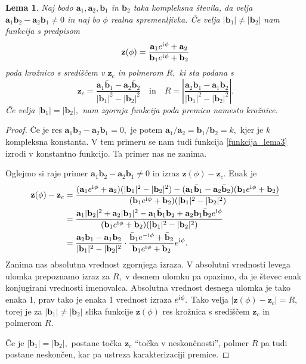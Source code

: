 \documentclass[12pt,a4paper,twoside]{article}
\newcommand{\iu}{\mathrm{i}\mkern1mu} %
\theoremstyle{definition} %
\theoremstyle{plain} %
\newtheorem{lema}[definicija]{Lema}
\numberwithin{equation}{section}  %
\newcommand{\aV}{\mathbf{a}}
\newcommand{\bV}{\mathbf{b}}
\newcommand{\zV}{\mathbf{z}}
\begin{document}
\begin{lema}
	\label{lema_3}
	Naj bodo $\aV_1,\aV_2,\bV_1$ in $\bV_2$ taka kompleksna števila, da velja $\aV_1\bV_2-\aV_2\bV_1\neq 0$ in naj bo $\phi$ realna spremenljivka. Če velja $|\bV_1|\neq|\bV_2|$ nam funkcija s predpisom
	\begin{equation}
		\label{funkcija_lema3}
		\zV(\phi)=\frac{\aV_1e^{\iu\phi}+\aV_2}{\bV_1e^{\iu\phi}+\bV_2}
	\end{equation}
	poda krožnico s središčem v $\zV_c$ in polmerom $R,$ ki sta podana s
	\begin{equation}
		\zV_c=\frac{\aV_1\bar{\bV}_1-\aV_2\bar{\bV}_2}{|\bV_1|^2-|\bV_2|^2}\quad\text{in}\quad R=\left|\frac{\aV_2\bV_1-\aV_1\bV_2}{|\bV_1|^2-|\bV_2|^2}\right|.
	\end{equation}
	Če velja $|\bV_1|=|\bV_2|,$ nam zgornja funkcija poda premico namesto krožnice.
\end{lema}
\begin{proof}
	Če je res $\aV_1\bV_2-\aV_2\bV_1=0,$ je potem $\aV_1/\aV_2=\bV_1/\bV_2=k,$ kjer je $k$ kompleksna konstanta. V tem primeru se nam tudi funkcija \eqref{funkcija_lema3} izrodi v konstantno funkcijo. Ta primer nas ne zanima.
	
	Oglejmo si raje primer $\aV_1\bV_2-\aV_2\bV_1\neq 0$ in izraz $\zV(\phi)-\zV_c.$ Enak je
	\begin{align*}
		\zV(\phi)-\zV_c&=\frac{(\aV_1e^{\iu\phi}+\aV_2)(|\bV_1|^2-|\bV_2|^2)-(\aV_1\bar{\bV}_1-\aV_2\bar{\bV}_2)(\bV_1e^{\iu\phi}+\bV_2)}{(\bV_1e^{\iu\phi}+\bV_2)(|\bV_1|^2-|\bV_2|^2)}\\
		&=\frac{\aV_1|\bV_2|^2+\aV_2|\bV_1|^2-\aV_1\bar{\bV}_1\bV_2+\aV_2\bV_1\bar{\bV}_2e^{\iu\phi}}{(\bV_1e^{\iu\phi}+\bV_2)(|\bV_1|^2-|\bV_2|^2)}\\
		&=\frac{\aV_2\bV_1-\aV_1\bV_2}{|\bV_1|^2-|\bV_2|^2}\cdot\frac{\bar{\bV}_1e^{-\iu\phi}+\bar{\bV}_2}{\bV_1e^{\iu\phi}+\bV_2}e^{\iu\phi}.
	\end{align*}
	Zanima nas absolutna vrednost zgornjega izraza. V absolutni vrednosti levega ulomka prepoznamo izraz za $R,$ v desnem ulomku pa opazimo, da je števec enak konjugirani vrednosti imenovalca. Absolutna vrednost desnega ulomka je tako enaka 1, prav tako je enaka 1 vrednost izraza $e^{\iu\phi}.$ Tako velja $|\zV(\phi)-\zV_c|=R,$ torej je za $|\bV_1|\neq|\bV_2|$ slika funkcije $\zV(\phi)$ res krožnica s središčem $\zV_c$ in polmerom $R.$
	
	Če je $|\bV_1|=|\bV_2|,$ postane točka $\zV_c$ ``točka v neskončnosti'', polmer $R$ pa tudi postane neskončen, kar pa ustreza karakterizaciji premice.
\end{proof}
\end{document}
